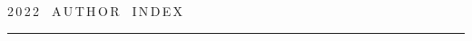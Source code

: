 






\def\leftfootline{\small{\textbf{\thepage}


\hfill ИНФОРМАТИКА И ЕЁ ПРИМЕНЕНИЯ\ \ \ том~16\ \ \ выпуск~4\ \ \ 2022}


}%


 \def\rightfootline{\small{ИНФОРМАТИКА И ЕЁ ПРИМЕНЕНИЯ\ \ \ том~16\ \ \ выпуск~4\ \ \ 2022


 \hfill \textbf{\thepage}}}





 \label{end\stat}





\newpage





\def\stat{cont-e}


{%




\raggedleft\Large \bf%


2\,0\,2\,2\ \ A\,U\,T\,H\,O\,R\ \ I\,N\,D\,E\,X \vskip 17pt


 \hrule


 \par


 }





\label{st\stat}





\def\tit{\ }





\def\aut{\ }


\def\auf{\ }





\def\leftkol{\ } %





\def\rightkol{\ } %





\titele{\tit}{\aut}{\auf}{\leftkol}{\rightkol}







